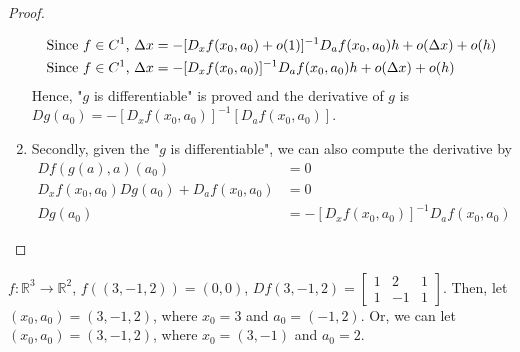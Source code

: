 \documentclass[11pt]{elegantbook}
\begin{document}
\begin{proof}
\begin{enumerate}
\begin{equation}
\begin{aligned}
                \textnormal{Since $f\in C^1$, }\Delta x&= -[D_x f(x_0,a_0)+o(1)]^{-1}D_a f(x_0,a_0)h+o(\Delta x)+o(h)\\
                \textnormal{Since $f\in C^1$, }\Delta x&= -[D_x f(x_0,a_0)]^{-1}D_a f(x_0,a_0)h+o(\Delta x)+o(h)
            \end{aligned}
            \nonumber
        \end{equation}
        Hence, "$g$ is differentiable" is proved and the derivative of $g$ is $Dg(a_0)=-[D_x f(x_0,a_0)]^{-1}[D_a f(x_0,a_0)]$.
        \item Secondly, given the "$g$ is differentiable", we can also compute the derivative by
        \begin{equation}
            \begin{aligned}
                Df(g(a),a)(a_0)&=0\\
                D_xf(x_0,a_0)Dg(a_0)+D_af(x_0,a_0)&=0\\
                Dg(a_0)&=-[D_x f(x_0,a_0)]^{-1}D_a f(x_0,a_0)
            \end{aligned}
            \nonumber
        \end{equation}
    \end{enumerate}
\end{proof}







\begin{example}
    $f: \mathbb{R}^3 \rightarrow \mathbb{R}^2$, $f((3,-1,2))=(0,0)$, $Df(3,-1,2)=\begin{bmatrix}
        1&2&1\\
        1&-1&1
    \end{bmatrix}$. Then,
    let $(x_0,a_0)=(3,-1,2)$, where $x_0=3$ and $a_0=(-1,2)$. Or, we can let $(x_0,a_0)=(3,-1,2)$, where $x_0=(3,-1)$ and $a_0=2$.
\end{example}
\end{document}
